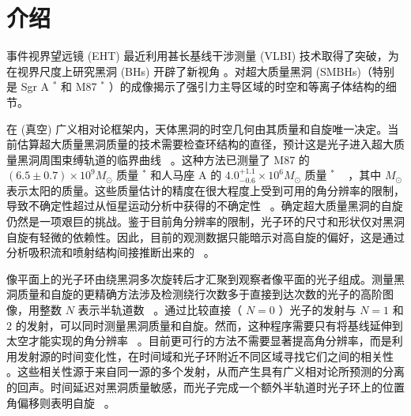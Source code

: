 \documentclass[aps,reprint,superscriptaddress,nofootinbib,floatfix,longbibliography,preprintnumbers]{revtex4-1}
\begin{document}
   \tableofcontents    
   \section{介绍  }     

事件视界望远镜 (EHT) 最近利用甚长基线干涉测量 (VLBI) 技术取得了突破，为在视界尺度上研究黑洞 (BHs) 开辟了新视角    \cite{EventHorizonTelescope:2019dse,EventHorizonTelescope:2022wkp}    。对超大质量黑洞 (SMBHs)（特别是 Sgr A    $^*$    和 M87    $^*$    ）的成像揭示了强引力主导区域的时空和等离子体结构的细节。  

在 (真空) 广义相对论框架内，天体黑洞的时空几何由其质量和自旋唯一决定。当前估算超大质量黑洞质量的技术需要检查环结构的直径，预计这是光子进入超大质量黑洞周围束缚轨道的临界曲线~    \cite{1965SvA.....8..868P,1968ApJ...151..659A,Luminet:1979nyg,Falcke:1999pj,Gralla:2019xty}    。这种方法已测量了 M87 的    $(6.5\pm 0.7)\times 10^9 M_\odot$    质量    $^*$       \cite{EventHorizonTelescope:2019ggy}    和人马座 A 的    $4.0^{+1.1}_{-0.6}\times 10^6 M_\odot$    质量    $^*$    ~    \cite{EventHorizonTelescope:2022exc}    ，其中    $M_\odot$    表示太阳的质量。这些质量估计的精度在很大程度上受到可用的角分辨率的限制，导致不确定性超过从恒星运动分析中获得的不确定性~    \cite{GRAVITY:2021xju,Do:2019txf}    。确定超大质量黑洞的自旋仍然是一项艰巨的挑战。鉴于目前角分辨率的限制，光子环的尺寸和形状仅对黑洞自旋有轻微的依赖性。因此，目前的观测数据只能暗示对高自旋的偏好，这是通过分析吸积流和喷射结构间接推断出来的~    \cite{Cruz-Osorio:2021cob,EventHorizonTelescope:2022urf}    。  

像平面上的光子环由绕黑洞多次旋转后才汇聚到观察者像平面的光子组成。测量黑洞质量和自旋的更精确方法涉及检测绕行次数多于直接到达次数的光子的高阶图像，用整数    $N$    表示半轨道数~    \cite{Johannsen:2010ru,Gralla:2019xty,Johnson:2019ljv,Gralla:2020srx,Broderick:2021ohx,Paugnat:2022qzy,Broderick:2022tfu,Wang:2022mjo}    。通过比较直接（   $N=0$   ）光子的发射与    $N=1$    和    $2$    的发射，可以同时测量黑洞质量和自旋。然而，这种程序需要只有将基线延伸到太空才能实现的角分辨率~    \cite{Johnson:2019ljv,Gralla:2020srx,Andrianov:2022snn,Gurvits:2022wgm,Shlentsova:2024qzj}    。目前更可行的方法不需要显著提高角分辨率，而是利用发射源的时间变化性，在时间域和光子环附近不同区域寻找它们之间的相关性~    \cite{Broderick:2005my,Moriyama:2015zfa,Saida:2016kpk,Moriyama:2019mhz,Tiede:2020jgo,Wong:2020ziu,Hadar:2020fda,Chesler:2020gtw,Hadar:2023kau}    。这些相关性源于来自同一源的多个发射，从而产生具有广义相对论所预测的分离的回声。时间延迟对黑洞质量敏感，而光子完成一个额外半轨道时光子环上的位置角偏移则表明自旋~    \cite{Gralla:2019drh,Hadar:2020fda}    。  
\end{document}
